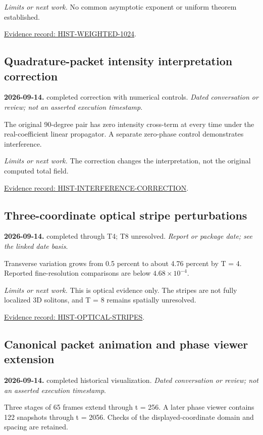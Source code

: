 \documentclass[11pt]{article}
\begin{document}
\noindent\textit{Limits or next work.} No common asymptotic exponent or uniform theorem established.

\noindent\href{https://github.com/matasvai/dysthe-paper/blob/codex/research-record-2026-11-05/research-record/2026-11-05/README.md#hist-weighted-1024}{Evidence record: HIST-WEIGHTED-1024}.
\subsection*{Quadrature-packet intensity interpretation correction}
\noindent\textbf{2026-09-14.} completed correction with numerical controls. \emph{Dated conversation or review; not an asserted execution timestamp}.\par
The original 90-degree pair has zero intensity cross-term at every time under the real-coefficient linear propagator. A separate zero-phase control demonstrates interference.

\noindent\textit{Limits or next work.} The correction changes the interpretation, not the original computed total field.

\noindent\href{https://github.com/matasvai/dysthe-paper/blob/codex/research-record-2026-11-05/research-record/2026-11-05/README.md#hist-interference-correction}{Evidence record: HIST-INTERFERENCE-CORRECTION}.
\subsection*{Three-coordinate optical stripe perturbations}
\noindent\textbf{2026-09-14.} completed through T4; T8 unresolved. \emph{Report or package date; see the linked date basis}.\par
Transverse variation grows from 0.5 percent to about 4.76 percent by T = 4. Reported fine-resolution comparisons are below $4.68\times 10^{-4}$.

\noindent\textit{Limits or next work.} This is optical evidence only. The stripes are not fully localized 3D solitons, and T = 8 remains spatially unresolved.

\noindent\href{https://github.com/matasvai/dysthe-paper/blob/codex/research-record-2026-11-05/research-record/2026-11-05/README.md#hist-optical-stripes}{Evidence record: HIST-OPTICAL-STRIPES}.
\subsection*{Canonical packet animation and phase viewer extension}
\noindent\textbf{2026-09-14.} completed historical visualization. \emph{Dated conversation or review; not an asserted execution timestamp}.\par
Three stages of 65 frames extend through t = 256. A later phase viewer contains 122 snapshots through t = 2056. Checks of the displayed-coordinate domain and spacing are retained.
\end{document}
